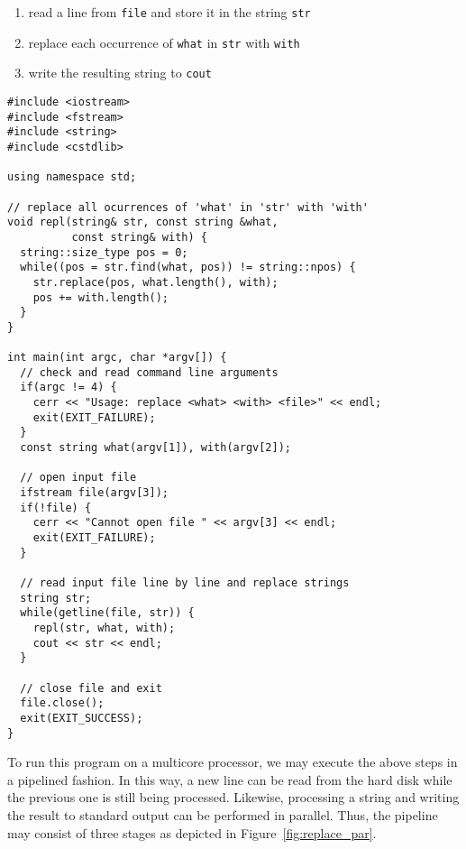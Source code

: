\begin{enumerate}\setlength{\itemsep}{0pt}
 \item read a line from \lstinline|file| and store it in the string \lstinline|str|
 \item replace each occurrence of \lstinline|what| in \lstinline|str| with \lstinline|with|
 \item write the resulting string to \lstinline|cout|
\end{enumerate}

\begin{lstlisting}[float,caption={Sequential program for replacing strings in a file},label={lst:replace_seq}]
#include <iostream>
#include <fstream>
#include <string>
#include <cstdlib>

using namespace std;

// replace all ocurrences of 'what' in 'str' with 'with'
void repl(string& str, const string &what,
          const string& with) {
  string::size_type pos = 0;
  while((pos = str.find(what, pos)) != string::npos) {
    str.replace(pos, what.length(), with);
    pos += with.length();
  }
}

int main(int argc, char *argv[]) {
  // check and read command line arguments
  if(argc != 4) {
    cerr << "Usage: replace <what> <with> <file>" << endl;
    exit(EXIT_FAILURE);
  }
  const string what(argv[1]), with(argv[2]);

  // open input file
  ifstream file(argv[3]);
  if(!file) {
    cerr << "Cannot open file " << argv[3] << endl;
    exit(EXIT_FAILURE);
  }

  // read input file line by line and replace strings
  string str;
  while(getline(file, str)) {
    repl(str, what, with);
    cout << str << endl;
  }

  // close file and exit
  file.close();
  exit(EXIT_SUCCESS);
}
\end{lstlisting}

To run this program on a multicore processor, we may execute the above steps in a pipelined fashion. In this way, a new line can be read from the hard disk while the previous one is still being processed. Likewise, processing a string and writing the result to standard output can be performed in parallel. Thus, the pipeline may consist of three stages as depicted in Figure~\ref{fig:replace_par}.

